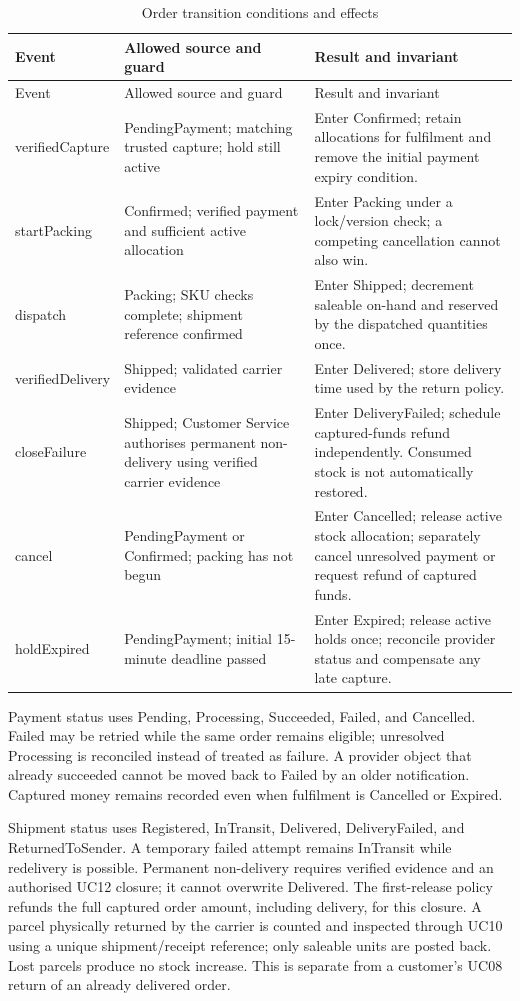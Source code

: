\begin{longtable}{P{.19\linewidth}P{.28\linewidth}P{.42\linewidth}}
\caption{Order transition conditions and effects}\label{tab:order-transitions}\\
\toprule Event & Allowed source and guard & Result and invariant \\\midrule\endfirsthead
\toprule Event & Allowed source and guard & Result and invariant \\\midrule\endhead
verifiedCapture & PendingPayment; matching trusted capture; hold still active & Enter Confirmed; retain allocations for fulfilment and remove the initial payment expiry condition.\\
startPacking & Confirmed; verified payment and sufficient active allocation & Enter Packing under a lock/version check; a competing cancellation cannot also win.\\
dispatch & Packing; SKU checks complete; shipment reference confirmed & Enter Shipped; decrement saleable on-hand and reserved by the dispatched quantities once.\\
verifiedDelivery & Shipped; validated carrier evidence & Enter Delivered; store delivery time used by the return policy.\\
closeFailure & Shipped; Customer Service authorises permanent non-delivery using verified carrier evidence & Enter DeliveryFailed; schedule captured-funds refund independently. Consumed stock is not automatically restored.\\
cancel & PendingPayment or Confirmed; packing has not begun & Enter Cancelled; release active stock allocation; separately cancel unresolved payment or request refund of captured funds.\\
holdExpired & PendingPayment; initial 15-minute deadline passed & Enter Expired; release active holds once; reconcile provider status and compensate any late capture.\\
\bottomrule
\end{longtable}

Payment status uses Pending, Processing, Succeeded, Failed, and Cancelled. Failed may be retried while the same order remains eligible; unresolved Processing is reconciled instead of treated as failure. A provider object that already succeeded cannot be moved back to Failed by an older notification. Captured money remains recorded even when fulfilment is Cancelled or Expired.

Shipment status uses Registered, InTransit, Delivered, DeliveryFailed, and ReturnedToSender. A temporary failed attempt remains InTransit while redelivery is possible. Permanent non-delivery requires verified evidence and an authorised UC12 closure; it cannot overwrite Delivered. The first-release policy refunds the full captured order amount, including delivery, for this closure. A parcel physically returned by the carrier is counted and inspected through UC10 using a unique shipment/receipt reference; only saleable units are posted back. Lost parcels produce no stock increase. This is separate from a customer's UC08 return of an already delivered order.

